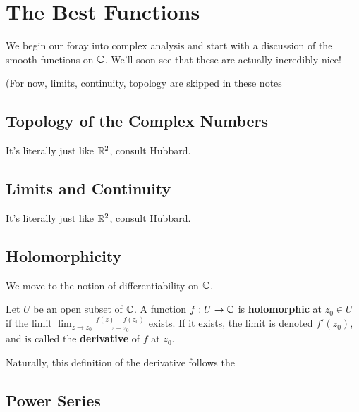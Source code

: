 \section{The Best Functions}

We begin our foray into complex analysis and start with a discussion of the smooth functions on $\mathbb C$. We'll soon see that these are actually incredibly nice!

(For now, limits, continuity, topology are skipped in these notes

\subsection{Topology of the Complex Numbers}
It's literally just like $\mathbb R^2$, consult Hubbard.

\subsection{Limits and Continuity}
It's literally just like $\mathbb R^2$, consult Hubbard.

\subsection{Holomorphicity}
We move to the notion of differentiability on $\mathbb C$.

\begin{definition}
  Let $U$ be an open subset of $\mathbb C$. A function $f : U \to \mathbb C$ is \textbf{holomorphic} at $z_0 \in U$ if the limit $\lim_{z \to z_0} \frac{f(z) - f(z_0)}{z - z_0}$ exists. If it exists, the limit is denoted $f'(z_0)$, and is called the \textbf{derivative} of $f$ at $z_0$.
\end{definition}

Naturally, this definition of the derivative follows the

\subsection{Power Series}